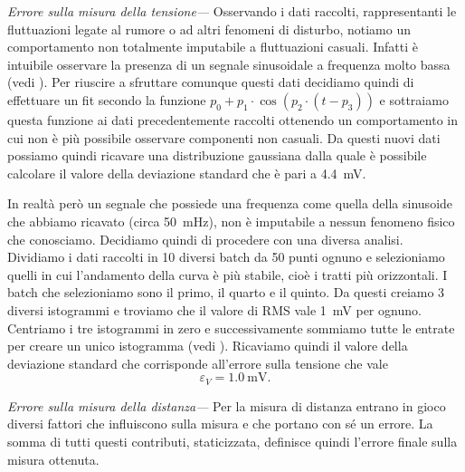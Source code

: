 \documentclass[
    rmp,
    reprint, 
    superscriptaddress, 
    altaffilletter, 
    amsmath, 
    amssymb,
    a4paper]{revtex4-2}
\begin{document}
\noindent\textit{Errore sulla misura della tensione---}
Osservando i dati raccolti, rappresentanti le fluttuazioni legate al rumore o ad altri fenomeni di disturbo, notiamo un comportamento non totalmente imputabile a fluttuazioni casuali. Infatti è intuibile osservare la presenza di un segnale sinusoidale a frequenza molto bassa (vedi ). Per riuscire a sfruttare comunque questi dati decidiamo quindi di effettuare un fit secondo la funzione $p_0+p_1\cdot \cos(p_2\cdot (t-p_3))$ e sottraiamo questa funzione ai dati precedentemente raccolti ottenendo un comportamento in cui non è più possibile osservare componenti non casuali. Da questi nuovi dati possiamo quindi ricavare una distribuzione gaussiana dalla quale è possibile calcolare il valore della deviazione standard che è pari a \SI{4.4}{\milli\volt}.

In realtà però un segnale che possiede una frequenza come quella della sinusoide che abbiamo ricavato (circa \SI{50}{\milli\hertz}), non è imputabile a nessun fenomeno fisico che conosciamo. Decidiamo quindi di procedere con una diversa analisi. Dividiamo i dati raccolti in 10 diversi batch da 50 punti ognuno e selezioniamo quelli in cui l'andamento della curva è più stabile, cioè i tratti più orizzontali. I batch che selezioniamo sono il primo, il quarto e il quinto. Da questi creiamo 3 diversi istogrammi e troviamo che il valore di RMS vale \SI{1}{\milli\volt} per ognuno. Centriamo i tre istogrammi in zero e successivamente sommiamo tutte le entrate per creare un unico istogramma (vedi ). Ricaviamo quindi il valore della deviazione standard che corrisponde all'errore sulla tensione che vale \[\varepsilon_{V} = \SI{1.0}{\milli\volt}.\]


\noindent\textit{Errore sulla misura della distanza---}
Per la misura di distanza entrano in gioco diversi fattori che influiscono sulla misura e che portano con sé un errore. La somma di tutti questi contributi, staticizzata, definisce quindi l'errore finale sulla misura ottenuta. 
\end{document}
